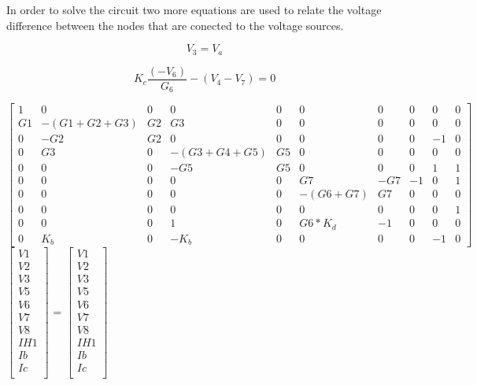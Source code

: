 In order to solve the circuit two more equations are used to relate the voltage difference between the nodes that 
are conected to the voltage sources.

\begin{equation}
	V_3 = V_a
	\label{}
\end{equation}

\begin{equation}
	K_c\frac{(-V_6)}{G_6}-(V_4-V_7)=0
	\label{}
\end{equation}

{\footnotesize

$ \begin{bmatrix}
1 & 0 & 0 & 0 & 0 & 0 & 0 & 0 & 0 & 0 \\
G1 & -(G1+G2+G3) & G2 & G3 & 0 & 0 & 0 & 0 & 0 & 0 \\
0 & -G2 & G2 & 0 & 0 & 0 & 0 & 0 & -1 & 0 \\
0 & G3 & 0 & -(G3+G4+G5) & G5 & 0 & 0 & 0 & 0 & 0 \\
0 & 0 & 0 & -G5 & G5 & 0 & 0 & 0 & 1 & 1 \\
0 & 0 & 0 & 0 & 0 & G7 & -G7 & -1 & 0 & 1 \\
0 & 0 & 0 & 0 & 0 & -(G6+G7) & G7 & 0 & 0 & 0 \\
0 & 0 & 0 & 0 & 0 & 0 & 0 & 0 & 0 & 1 \\
0 & 0 & 0 & 1 & 0 & G6*K_d & -1 & 0 & 0 & 0 \\
0 & K_b & 0 & -K_b & 0 & 0 & 0 & 0 & -1 & 0 
\end{bmatrix}  $
$ \begin{bmatrix}
V1 \\
V2 \\
V3 \\
V5 \\
V6 \\
V7 \\
V8 \\
IH1 \\
Ib \\
Ic \\
\end{bmatrix}  $
=
$ \begin{bmatrix}
V1 \\
V2 \\
V3 \\
V5 \\
V6 \\
V7 \\
V8 \\
IH1 \\
Ib \\
Ic \\
\end{bmatrix}  $


}
